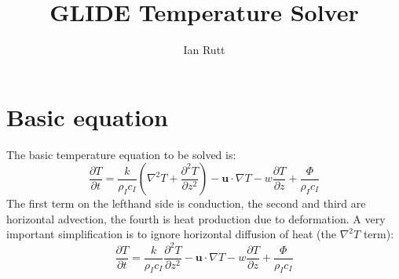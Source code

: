 \documentclass[10pt,english,a4paper]{article}
\begin{document}
\title{GLIDE Temperature Solver}
\author{Ian Rutt}
\maketitle

\section{Basic equation}
%
The basic temperature equation to be solved is:
%
\begin{equation}
  \frac{\partial T}{\partial t} = \frac{k}{\rho_I c_I}\left(\nabla^2 T
  +\frac{\partial^2 T}{\partial z^2}\right)
  -\mathbf{u}\cdot\nabla T
  -w\frac{\partial T}{\partial z}
  +\frac{\Phi}{\rho_I c_I}
\end{equation}
%
The first term on the lefthand side is conduction, the second and
third are horizontal advection, the fourth is heat production due to
deformation. A very important simplification is to ignore horizontal
diffusion of heat (the $\nabla^2 T$ term):
%
\begin{equation}
  \frac{\partial T}{\partial t} = \frac{k}{\rho_I c_I}\frac{\partial^2 T}{\partial z^2}
  -\mathbf{u}\cdot\nabla T
  -w\frac{\partial T}{\partial z}
  +\frac{\Phi}{\rho_I c_I}
\label{eqn.temp_eqn}
\end{equation}
%
\end{document}
